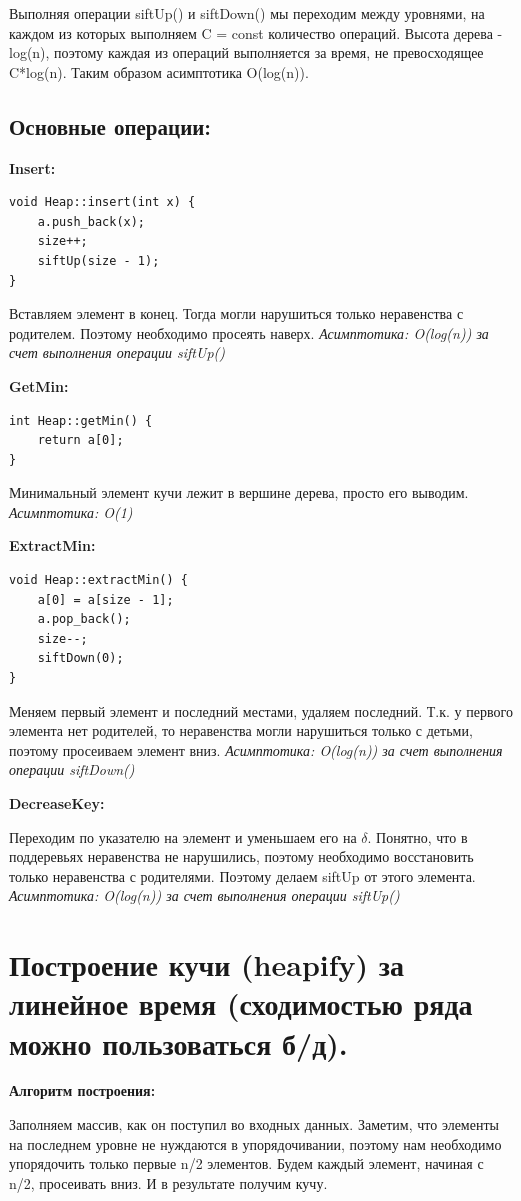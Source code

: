 Выполняя операции siftUp() и siftDown() мы переходим между уровнями, на каждом из которых выполняем C = const количество операций. Высота дерева - log(n), поэтому каждая из операций выполняется за время, не превосходящее C*log(n). Таким образом асимптотика O(log(n)).

\subsection*{Основные операции:}

\textbf{Insert: }
 \begin{lstlisting}
void Heap::insert(int x) {
    a.push_back(x); 
    size++; 
    siftUp(size - 1); 
}
\end{lstlisting}
Вставляем элемент в конец. Тогда могли нарушиться только неравенства с родителем. Поэтому необходимо просеять наверх. \textit{Асимптотика: O(log(n)) за счет выполнения операции siftUp()}

\textbf{GetMin: }
 \begin{lstlisting}
int Heap::getMin() { 
    return a[0]; 
}
\end{lstlisting}
Минимальный элемент кучи лежит в вершине дерева, просто его выводим. \textit{Асимптотика: O(1)}

\textbf{ExtractMin: }
 \begin{lstlisting}
void Heap::extractMin() {
    a[0] = a[size - 1]; 
    a.pop_back();
    size--;
    siftDown(0);
}
\end{lstlisting}
Меняем первый элемент и последний местами, удаляем последний. Т.к. у первого элемента нет родителей, то неравенства могли нарушиться только с детьми, поэтому просеиваем элемент вниз.\textit{ Асимптотика: O(log(n)) за счет выполнения операции siftDown()}

\textbf{DecreaseKey:
}

Переходим по указателю на элемент и уменьшаем его на $\delta$. Понятно, что в поддеревьях неравенства не нарушились, поэтому необходимо восстановить только неравенства с родителями. Поэтому делаем siftUp от этого элемента.\textit{ Асимптотика: O(log(n)) за счет выполнения операции siftUp()}

\section{Построение кучи (heapify) за линейное время (сходимостью ряда можно пользоваться б/д).}
\textbf{Алгоритм построения: }

Заполняем массив, как он поступил во входных данных. Заметим, что элементы на последнем уровне не нуждаются в упорядочивании, поэтому нам необходимо упорядочить только первые n/2 элементов. Будем каждый элемент, начиная с n/2, просеивать вниз. И в результате получим кучу.


